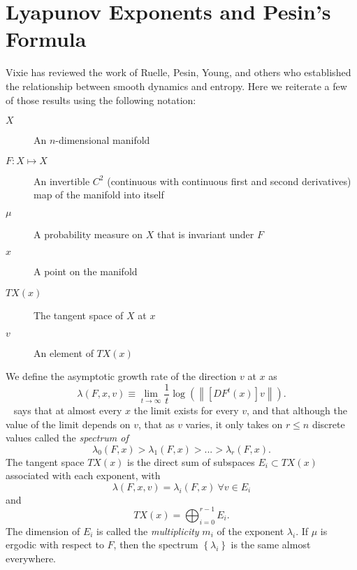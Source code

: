 \section{Lyapunov Exponents and Pesin's Formula}
\label{sec:PesinFormula}

Vixie\cite{vixie02} has reviewed the work of
Ruelle\cite{ruelle-1978-1}, Pesin\cite{pesin77},
Young\cite{young95-1}, and others who established the relationship
between smooth dynamics and entropy.  Here we reiterate a few of those
results using the following notation:
\begin{description}
\item[$X$] An $n$-dimensional manifold
\item[$F:X\mapsto X$] An invertible $C^2$ (continuous with continuous
  first and second derivatives) map of the manifold into itself
\item[$\mu$] A probability measure on $X$ that is invariant under $F$
\item[$x$] A point on the manifold
\item[$TX(x)$] The tangent space of $X$ at $x$
\item[$v$] An element of $TX(x)$
\end{description}

We define the asymptotic growth rate of the direction $v$ at $x$ as
\begin{equation}
  \label{eq:growthVX}
  \lambda(F,x,v) \equiv \lim_{t\rightarrow \infty} \frac{1}{t} \log
  \left( \left\| [DF^t(x)] v \right\| \right).
\end{equation}
 ~\cite{young95-1,katok95, mane87} says
that at almost every $x$ the limit exists for every $v$, and that
although the value of the limit depends on $v$, that as $v$ varies, it
only takes on $r \leq n$ discrete values called the \emph{spectrum of
  }
\begin{equation}
  \label{eq:LyapunovSpectrum}
  \lambda_0(F,x) > \lambda_1(F,x) > ... > \lambda_r(F,x).
\end{equation}
The tangent space $TX(x)$ is the direct sum of subspaces $E_i \subset
TX(x)$ associated with each exponent, with
\begin{equation*}
  \lambda(F,x,v) = \lambda_i(F,x) ~ \forall v \in E_i
\end{equation*}
and
\begin{equation*}
  TX(x) = \bigoplus_{i=0}^{r-1} E_i. %
\end{equation*}
The dimension of $E_i$ is called the \emph{multiplicity} $m_i$ of the
exponent $\lambda_i$. If $\mu$ is ergodic with respect to $F$, then
the spectrum $\left\{ \lambda_i \right\}$ is the same almost
everywhere.


